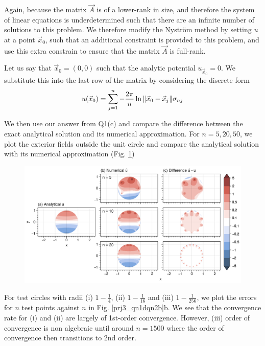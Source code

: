 \begin{enumerate}[label=(\alph*),leftmargin=*,itemsep=0mm]
    Again, because the matrix $\vec{A}$ is of a lower-rank in size, and therefore the system of linear equations is underdetermined such that there are an infinite number of solutions to this problem.  We therefore modify the Nyström method by setting $u$ at a point $\vec{x}_0$, such that an additional constraint is provided to this problem, and use this extra constrain to ensure that the matrix $\vec{A}$ is full-rank.
    
    Let us say that $\vec{x}_0 = (0,0)$ such that the analytic potential $u_{\vec{x}_0} = 0$.  We substitute this into the last row of the matrix by considering the discrete form
    \begin{align}
        u(\vec{x}_0) = \sum_{j=1}^n - \frac{2\pi}{n} \ln \norm{\vec{x}_0-\vec{x}_j} \sigma_{nj}
    \end{align}
    
    We then use our answer from Q1(c) and compare the difference between the exact analytical solution and its numerical approximation.  For $n=5,20,50$, we plot the exterior fields outside the unit circle and compare the analytical solution with its numerical approximation (Fig. \ref{prj3_qn2b_field})

    \begin{figure}[h!]
    \centering
    \includegraphics[width=\textwidth]{figures/prj3_qn2b_field.png}\\
    \caption{}
    \label{prj3_qn2b_field}
    \end{figure}
    
    For test circles with radii (i) $1-\frac{1}{4}$, (ii) $1-\frac{1}{16}$ and (iii) $1-\frac{1}{256}$, we plot the errors for $n$ test points against $n$ in Fig. \ref{prj3_qn1dqn2b}b.  We see that the convergence rate for (i) and (ii) are largely of 1st-order convergence.  However, (iii) order of convergence is non algebraic until around $n=1500$ where the order of convergence then transitions to 2nd order.
    
    
\end{enumerate}